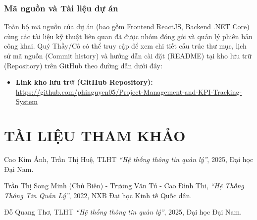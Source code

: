\documentclass[a4paper,13.5pt]{extreport}
\begin{document}
\subsection{Mã nguồn và Tài liệu dự án}

Toàn bộ mã nguồn của dự án (bao gồm Frontend ReactJS, Backend .NET Core) cùng các tài liệu kỹ thuật liên quan đã được nhóm đóng gói và quản lý phiên bản công khai. Quý Thầy/Cô có thể truy cập để xem chi tiết cấu trúc thư mục, lịch sử mã nguồn (Commit history) và hướng dẫn cài đặt (README) tại kho lưu trữ (Repository) trên GitHub theo đường dẫn dưới đây:

\begin{itemize}
    \item \textbf{Link kho lưu trữ (GitHub Repository):} \url{https://github.com/phinguyen05/Project-Management-and-KPI-Tracking-System}
\end{itemize}

\chapter*{TÀI LIỆU THAM KHẢO}

\begin{enumerate}[label={[\arabic*]}, leftmargin=*]
    \item Cao Kim Ánh, Trần Thị Huệ, TLHT \textit{“Hệ thống thông tin quản lý”}, 2025, Đại học Đại Nam.
    \item Trần Thị Song Minh (Chủ Biên) - Trương Văn Tú - Cao Đình Thi, \textit{“Hệ Thống Thông Tin Quản Lý”}, 2022, NXB Đại học Kinh tế Quốc dân.
    \item Đỗ Quang Thơ, TLHT \textit{“Hệ thống thông tin quản lý”}, 2025, Đại học Đại Nam.
\end{enumerate}
\end{document}
